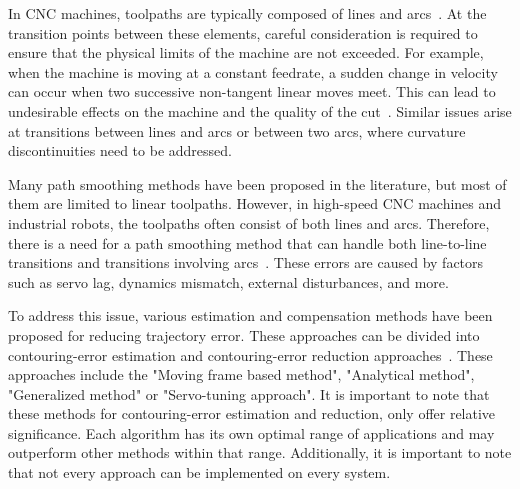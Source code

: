In \acrshort{CNC} machines, toolpaths are typically composed of lines and arcs~\cite{Liu.2020}. At the transition points between these elements, careful consideration is required to ensure that the physical limits of the machine are not exceeded. For example, when the machine is moving at a constant feedrate, a sudden change in velocity can occur when two successive non-tangent linear moves meet. This can lead to undesirable effects on the machine and the quality of the cut~\cite{Boujelbene.2004}. Similar issues arise at transitions between lines and arcs or between two arcs, where curvature discontinuities need to be addressed. 

Many path smoothing methods have been proposed in the literature, but most of them are limited to linear toolpaths. However, in high-speed \acrshort{CNC} machines and industrial robots, the toolpaths often consist of both lines and arcs. Therefore, there is a need for a path smoothing method that can handle both line-to-line transitions and transitions involving arcs~\cite{Shahzadeh.2018}. These errors are caused by factors such as servo lag, dynamics mismatch, external disturbances, and more.%

To address this issue, various estimation and compensation methods have been proposed for reducing trajectory error. These approaches can be divided into contouring-error estimation and contouring-error reduction approaches~\cite{Jia.2018}. These approaches include the "Moving frame based method", "Analytical method", "Generalized method" or "Servo-tuning approach". It is important to note that these methods for contouring-error estimation and reduction, only offer relative significance. Each algorithm has its own optimal range of applications and may outperform other methods within that range. Additionally, it is important to note that not every approach can be implemented on every system.





